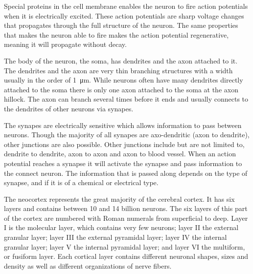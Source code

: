 \documentclass[altfont, fleqn]{uiophd}
\begin{document}
Special proteins in the cell membrane enables the neuron to
fire action potentials when it is electrically excited. 
These action potentials are sharp voltage changes that propagates through
the full structure of the neuron.
The same properties that makes the neuron able to fire makes 
the action potential {regenerative}, meaning it will propagate
without decay.

The body of the neuron, the {soma}, has {dendrites} and 
the axon attached to it. 
The dendrites and the axon are very thin branching structures 
with a width usually in the order of \SI{1}{\micro\metre}. 
While neurons often have many dendrites directly attached to the soma
there is only one axon attached to the soma at the axon hillock.
The axon can branch several times before it ends and 
usually connects to the dendrites of other neurons via synapes.

The synapes are electrically sensitive which allows information
to pass between neurons. 
Though the majority of all synapes are axo-dendritic 
(axon to dendrite),
other junctions are also possible.
Other junctions include but are not limited to,
dendrite to dendrite, 
axon to axon and 
axon to blood vessel. 
When an action potential reaches a synapse it will activate
the synapse and pass information to the connect neuron. 
The information that is passed along depends on the type of synapse,
and if it is of a chemical or electrical type.

The neocortex represents the great majority of the cerebral cortex. 
It has six layers and contains between 10 and 14 billion neurons. 
The six layers of this part of the cortex are numbered with Roman numerals 
from superficial to deep. Layer I is the molecular layer, which contains 
very few neurons; layer II the external granular layer; 
layer III the external pyramidal layer; layer IV the internal 
granular layer; layer V the internal pyramidal layer; and layer VI the 
multiform, or fusiform layer. Each cortical layer contains different neuronal 
shapes, sizes and density as well as different organizations of nerve fibers.


\end{document}

